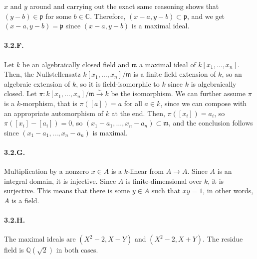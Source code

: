 \documentclass{article}
\newcommand{\Q}{\mathbb{Q}}
\newcommand{\C}{\mathbb{C}}
\newcommand{\m}{\mathfrak{m}}
\newcommand{\p}{\mathfrak{p}}
\begin{document}
$x$ and $y$ around and carrying out the exact same reasoning shows that $(y-b) \in \p$ for some $b \in \C$. Therefore, $(x-a,y-b) \subset \p$, and we get $(x-a,y-b) = \p$ since $(x-a,y-b)$ is a maximal ideal.

\paragraph{3.2.F.} Let $k$ be an algebraically closed field and $\m$ a maximal ideal of $k[x_1, \dots, x_n]$. Then, the Nullstellensatz $k[x_1,\dots,x_n]/\m$ is a finite field extension of $k$, so an algebraic extension of $k$, so it is field-isomorphic to $k$ since $k$ is algebraically closed. Let $\pi : k[x_1,\dots,x_n]/\m \xrightarrow{\sim} k$ be the isomorphism. We can further assume $\pi$ is a $k$-morphism, that is $\pi([a]) = a$ for all $a \in k$, since we can compose with an appropriate automorphism of $k$ at the end. Then, $\pi([x_i]) = a_i$, so $\pi([x_i] - [a_i]) = 0$, so $(x_1-a_1,\dots,x_n-a_n) \subset \m$, and the conclusion follows since $(x_1-a_1,\dots,x_n-a_n)$ is maximal.

\paragraph{3.2.G.} Multiplication by a nonzero $x\in A$ is a $k$-linear from $A \to A$. Since $A$ is an integral domain, it is injective. Since $A$ is finite-dimensional over $k$, it is surjective. This means that there is some $y \in A$ such that $xy=1$, in other words, $A$ is a field.

\paragraph{3.2.H.} The maximal ideals are $(X^2 - 2, X-Y)$ and $(X^2 - 2, X+Y)$. The residue field is $\Q(\sqrt{2})$ in both cases.
\end{document}
